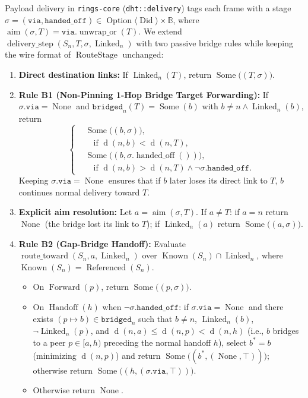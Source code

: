 \documentclass[journal]{IEEEtran}
\newcommand{\dist}{\operatorname{d}}
\newcommand{\Known}{\operatorname{Known}}
\newcommand{\Linked}{\operatorname{Linked}}
\newcommand{\Referenced}{\operatorname{Referenced}}
\newcommand{\Aim}{\operatorname{aim}}
\newcommand{\RouteStage}{\operatorname{RouteStage}}
\begin{document}
Payload delivery in \texttt{rings-core} (\texttt{dht::delivery}) tags each frame
with a stage $\sigma = (\texttt{via}, \texttt{handed\_off}) \in
\operatorname{Option}\langle\operatorname{Did}\rangle \times \mathbb{B}$, where
$\Aim(\sigma, T) = \texttt{via}.\operatorname{unwrap\_or}(T)$. We extend
$\operatorname{delivery\_step}(S_n, T, \sigma, \Linked_n)$ with two passive
bridge rules while keeping the wire format of $\RouteStage$ unchanged:
\begin{enumerate}
  \item \textbf{Direct destination links:} If $\Linked_n(T)$, return
  $\operatorname{Some}\bigl((T, \sigma)\bigr)$.
  \item \textbf{Rule B1 (Non-Pinning 1-Hop Bridge Target Forwarding):} If
  $\sigma.\texttt{via} = \operatorname{None}$ and $\texttt{bridged}_n(T) =
  \operatorname{Some}(b)$ with $b \neq n \land \Linked_n(b)$, return
  \begin{equation}
    \left\{\begin{aligned}
      &\operatorname{Some}\bigl((b, \sigma)\bigr), \\
      &\quad\text{if } \dist(n, b) < \dist(n, T), \\
      &\operatorname{Some}\bigl((b, \sigma.\operatorname{handed\_off}())\bigr), \\
      &\quad\text{if } \dist(n, b) > \dist(n, T) \land \neg\sigma.\texttt{handed\_off}.
    \end{aligned}\right.
    \label{eq:rule-b1}
  \end{equation}
  Keeping $\sigma.\texttt{via} = \operatorname{None}$ ensures that if $b$ later
  loses its direct link to $T$, $b$ continues normal delivery toward $T$.
  \item \textbf{Explicit aim resolution:} Let $a = \Aim(\sigma, T)$. If $a \neq T$:
  if $a = n$ return $\operatorname{None}$ (the bridge lost its link to $T$); if
  $\Linked_n(a)$ return $\operatorname{Some}\bigl((a, \sigma)\bigr)$.
  \item \textbf{Rule B2 (Gap-Bridge Handoff):} Evaluate
  $\operatorname{route\_toward}(S_n, a, \Linked_n)$ over
  $\Known(S_n) \cap \Linked_n$, where $\Known(S_n) = \Referenced(S_n)$.
  \begin{itemize}
    \item On $\operatorname{Forward}(p)$, return $\operatorname{Some}\bigl((p, \sigma)\bigr)$.
    \item On $\operatorname{Handoff}(h)$ when $\neg\sigma.\texttt{handed\_off}$:
    if $\sigma.\texttt{via} = \operatorname{None}$ and there exists
    $(p \mapsto b) \in \texttt{bridged}_n$ such that $b \neq n$, $\Linked_n(b)$,
    $\neg\Linked_n(p)$, and $\dist(n, a) \le \dist(n, p) < \dist(n, h)$ (i.e., $b$
    bridges to a peer $p \in [a, h)$ preceding the normal handoff $h$), select
    $b^* = b$ (minimizing $\dist(n, p)$) and return
    $\operatorname{Some}\bigl((b^*, (\operatorname{None}, \top))\bigr)$;
    otherwise return $\operatorname{Some}\bigl((h, (\sigma.\texttt{via}, \top))\bigr)$.
    \item Otherwise return $\operatorname{None}$.
  \end{itemize}
\end{enumerate}
\end{document}
